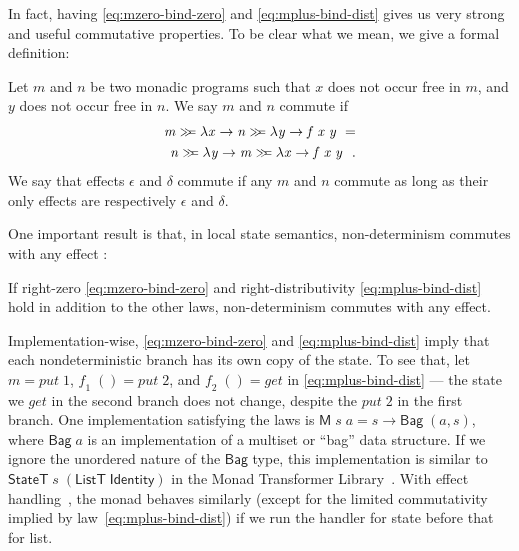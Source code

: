\documentclass{llncs}
\newcommand{\Conid}[1]{\mathit{#1}}
\newcommand{\Varid}[1]{\mathit{#1}}
\let\Varid\mathit
\let\Conid\mathsf
\begin{document}
In fact, having \eqref{eq:mzero-bind-zero} and \eqref{eq:mplus-bind-dist} gives us very strong and useful commutative properties.
To be clear what we mean, we give a formal definition:
\begin{definition}
Let \ensuremath{\Varid{m}} and \ensuremath{\Varid{n}} be two monadic programs such that \ensuremath{\Varid{x}} does not occur free in \ensuremath{\Varid{m}}, and \ensuremath{\Varid{y}} does not occur free in \ensuremath{\Varid{n}}. We say \ensuremath{\Varid{m}} and \ensuremath{\Varid{n}} commute if
\begin{equation} \label{eq:commute}
\begin{split}
  \ensuremath{\Varid{m}\mathrel{\hstretch{0.7}{>\!\!>\!\!=}}\lambda \Varid{x}\to \Varid{n}\mathrel{\hstretch{0.7}{>\!\!>\!\!=}}\lambda \Varid{y}\to \Varid{f}\;\Varid{x}\;\Varid{y}~\mathrel{=}}\\
   \ensuremath{\Varid{n}\mathrel{\hstretch{0.7}{>\!\!>\!\!=}}\lambda \Varid{y}\to \Varid{m}\mathrel{\hstretch{0.7}{>\!\!>\!\!=}}\lambda \Varid{x}\to \Varid{f}\;\Varid{x}\;\Varid{y}~~.}
\end{split}
\end{equation}
We say that effects \ensuremath{\epsilon} and \ensuremath{\delta} commute if any \ensuremath{\Varid{m}} and \ensuremath{\Varid{n}} commute as long as their only effects are respectively \ensuremath{\epsilon} and \ensuremath{\delta}.
\end{definition}
One important result is that, in local state semantics, non-determinism commutes with any effect :
\begin{theorem} \label{thm:nondet-commute}
If right-zero \eqref{eq:mzero-bind-zero} and right-distributivity \eqref{eq:mplus-bind-dist} hold
in addition to the other laws, non-determinism commutes with any effect.
\end{theorem}

Implementation-wise, \eqref{eq:mzero-bind-zero} and \eqref{eq:mplus-bind-dist} imply that each nondeterministic branch has its own copy of the state.
To see that, let \ensuremath{\Varid{m}\mathrel{=}\Varid{put}\;\mathrm{1}}, \ensuremath{\Varid{f}_{1}\;()\mathrel{=}\Varid{put}\;\mathrm{2}}, and \ensuremath{\Varid{f}_{2}\;()\mathrel{=}\Varid{get}} in \eqref{eq:mplus-bind-dist} --- the state we \ensuremath{\Varid{get}} in the second branch does not change, despite the \ensuremath{\Varid{put}\;\mathrm{2}} in the first branch.
One implementation satisfying the laws is \ensuremath{\Conid{M}\;\Varid{s}\;\Varid{a}\mathrel{=}\Varid{s}\to \Conid{Bag}\;(\Varid{a},\Varid{s})}, where
\ensuremath{\Conid{Bag}\;\Varid{a}} is an implementation of a multiset or ``bag'' data structure.
If we ignore the unordered nature of the \ensuremath{\Conid{Bag}} type, this implementation is
similar to \ensuremath{\Conid{StateT}\;\Varid{s}\;(\Conid{ListT}\;\Conid{Identity})} in the Monad Transformer
Library~\cite{MTL:14}. With effect
handling~\cite{Wu:14:Effect,KiselyovIshii:15:Freer}, the monad behaves similarly
(except for the limited commutativity implied by
law~\eqref{eq:mplus-bind-dist}) if we run the handler for state before that for
list.
\end{document}
